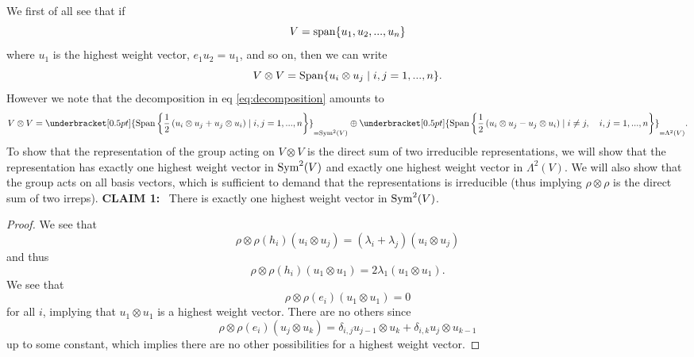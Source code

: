 We first of all see that if
\begin{equation}
V={\rm span}\{u_{1},u_{2},...,u_{n}\}
\end{equation}
where $u_{1}$ is the highest weight vector, $e_{1}u_{2}=u_{1}$,
and so on, then we can write
\begin{equation}
V\otimes V={\rm Span}\{u_{i}\otimes u_{j}\mid i,j=1,...,n\}.
\end{equation}
However we note that the decomposition in eq \eqref{eq:decomposition}
amounts to
\begin{equation*}
V\otimes V=\underbracket[0.5pt]{{\rm Span}\left\{\frac{1}{2}\left(u_{i}\otimes
u_{j}+u_{j}\otimes u_{i}\right)\mid i,j=1,...,n\right\}}_{={\rm Sym}^{2}(V)}\oplus\underbracket[0.5pt]{{\rm
  Span}\left\{\frac{1}{2}\left(u_{i}\otimes u_{j}-u_{j}\otimes
u_{i}\right)\mid i\not=j,\quad i,j=1,...,n\right\}}_{=\Lambda^{2}(V)}.
\end{equation*}
To show that the representation of the group acting on $V\otimes
V$ is the direct sum of two irreducible representations, we will
show that the representation has exactly one highest weight
vector in ${\rm Sym}^{2}(V)$ and exactly one highest weight
vector in $\Lambda^{2}(V)$. We will also show that the group acts
on all basis vectors, which is sufficient to demand that the
representations is irreducible (thus implying $\rho\otimes\rho$ is
the direct sum of two irreps).
\vskip 4pt
\noindent\textbf{C\uppercase{{\footnotesize laim}} 1:}~ There is exactly one highest weight
vector in ${\rm Sym}^{2}(V)$.

\begin{proof}
We see that 
\begin{equation}
\rho\otimes\rho(h_{i})(u_{i}\otimes
u_{j})=(\lambda_{i}+\lambda_{j})(u_{i}\otimes u_{j})
\end{equation}
and thus
\begin{equation}
\rho\otimes\rho(h_{i})(u_{1}\otimes u_{1})=2\lambda_{1}(u_{1}\otimes u_{1}).
\end{equation}
We see that
\begin{equation}
\rho\otimes\rho(e_{i})(u_{1}\otimes u_{1})=0
\end{equation}
for all $i$, implying that $u_{1}\otimes u_{1}$ is a highest
weight vector. There are no others since
\begin{equation}
\rho\otimes\rho(e_{i})(u_{j}\otimes
u_{k})=\delta_{i,j}u_{j-1}\otimes u_{k}+\delta_{i,k}u_{j}\otimes
u_{k-1}
\end{equation}
up to some constant, which implies there are no other
possibilities for a highest weight vector.
\end{proof}


